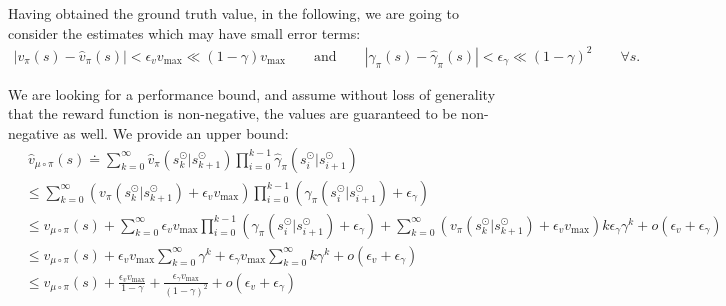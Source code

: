 
Having obtained the ground truth value, in the following, we are going to consider the estimates which may have small error terms:
\begin{align}
    |v_\pi(s)-\hat{v}_\pi(s)|<\epsilon_v  v_{\text{max}} \ll (1-\gamma)  v_{\text{max}} \quad\quad\text{and}\quad\quad |\gamma_\pi(s)-\hat{\gamma}_\pi(s)|<\epsilon_\gamma\ll (1-\gamma)^2 \quad\quad\forall s.
\end{align}

We are looking for a performance bound, and assume without loss of generality that the reward function is non-negative, \st{} the values are guaranteed to be non-negative as well. We provide an upper bound:
\begin{align}
    &\ \hat{v}_{\mu\circ\pi}(s) \doteq \sum_{k=0}^\infty \hat{v}_\pi(s^{\odot}_k|s^{\odot}_{k+1}) \prod_{i=0}^{k-1}\hat{\gamma}_\pi (s^{\odot}_i|s^{\odot}_{i+1})  \\
    &\leq \sum_{k=0}^\infty \left(v_\pi(s^{\odot}_k|s^{\odot}_{k+1})+\epsilon_v  v_{\text{max}}\right) \prod_{i=0}^{k-1}\left(\gamma_\pi(s^{\odot}_i|s^{\odot}_{i+1})+\epsilon_\gamma\right)  \\
    &\leq v_{\mu\circ\pi}(s) + \sum_{k=0}^\infty \epsilon_v  v_{\text{max}} \prod_{i=0}^{k-1}\left(\gamma_\pi(s^{\odot}_i|s^{\odot}_{i+1})+\epsilon_\gamma\right) + \sum_{k=0}^\infty \left(v_\pi(s^{\odot}_k|s^{\odot}_{k+1})+\epsilon_v v_{\text{max}}\right) k\epsilon_\gamma\gamma^k + o(\epsilon_v+\epsilon_\gamma)  \\
    &\leq v_{\mu\circ\pi}(s) + \epsilon_v  v_{\text{max}} \sum_{k=0}^\infty  \gamma^k + \epsilon_\gamma v_{\text{max}} \sum_{k=0}^\infty k\gamma^k  + o(\epsilon_v+\epsilon_\gamma) \\
    &\leq v_{\mu\circ\pi}(s) + \frac{\epsilon_v  v_{\text{max}}}{1-\gamma} + \frac{\epsilon_\gamma v_{\text{max}}}{(1-\gamma)^2}  + o(\epsilon_v+\epsilon_\gamma)
\end{align}

